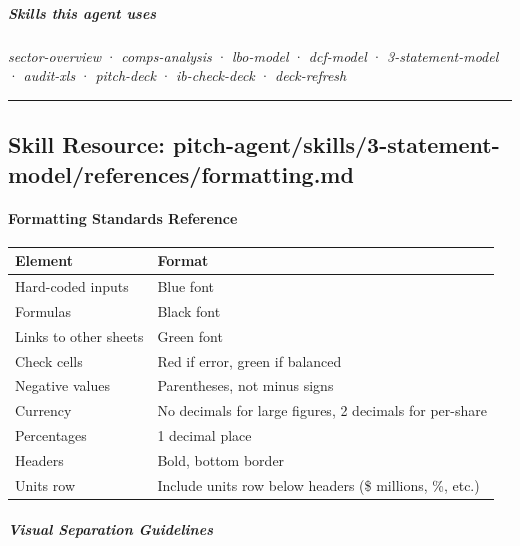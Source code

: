 \documentclass[11pt]{article}
\begin{document}
\subparagraph{Skills this agent uses}\mbox{}\par

\emph{sector-overview} · \emph{comps-analysis} · \emph{lbo-model} · \emph{dcf-model} · \emph{3-statement-model} · \emph{audit-xls} · \emph{pitch-deck} · \emph{ib-check-deck} · \emph{deck-refresh}


\vspace{0.8em}\hrule\vspace{0.8em}

\subsection{Skill Resource: pitch-agent/skills/3-statement-model/references/formatting.md}\label{file:pitch-agent-skills-3-statement-model-references-formatting-md}

\paragraph{Formatting Standards Reference}\mbox{}\par

\begingroup
\small
\setlength{\tabcolsep}{2pt}
\begin{longtable}{>{\RaggedRight\arraybackslash\hspace{0pt}}p{}>{\RaggedRight\arraybackslash\hspace{0pt}}p{}}
\toprule
{} \textbf{Element} & \textbf{Format} \\
\midrule
{} Hard-coded inputs & Blue font \\
{} Formulas & Black font \\
{} Links to other sheets & Green font \\
{} Check cells & Red if error, green if balanced \\
{} Negative values & Parentheses, not minus signs \\
{} Currency & No decimals for large figures, 2 decimals for per-share \\
{} Percentages & 1 decimal place \\
{} Headers & Bold, bottom border \\
{} Units row & Include units row below headers (\$ millions, \%, etc.) \\
\bottomrule
\end{longtable}
\endgroup

\subparagraph{Visual Separation Guidelines}\mbox{}\par
\end{document}
